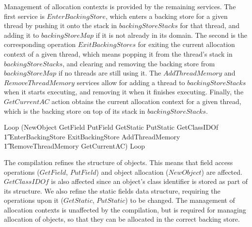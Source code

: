 Management of allocation contexts is provided by the remaining
services.
The first service is $EnterBackingStore$, which enters a backing store
for a given thread by pushing it onto the stack in
$backingStoreStacks$ for that thread, and adding it to
$backingStoreMap$ if it is not already in its domain.
The second is the corresponding operation $ExitBackingStores$ for
exiting the current allocation context of a given thread, which means
popping it from the thread's stack in $backingStoreStacks$, and
clearing and removing the backing store from $backingStoreMap$ if no
threads are still using it.
The $AddThreadMemory$ and $RemoveThreadMemory$ services allow for
adding a thread to $backingStoreStacks$ when it starts executing, and
removing it when it finishes executing.
Finally, the $GetCurrentAC$ action obtains the current allocation
context for a given thread, which is the backing store on top of its
stack in $backingStoreStacks$.
\begin{circusaction}
  Loop \circdef (NewObject \extchoice GetField \extchoice PutField \extchoice GetStatic \extchoice PutStatic \extchoice GetClassIDOf \\
  \t1 {} \extchoice EnterBackingStore \extchoice ExitBackingStore \extchoice AddThreadMemory \\
  \t1 {} \extchoice RemoveThreadMemory \extchoice GetCurrentAC)
  \circseq Loop
\end{circusaction}

The compilation refines the structure of objects.
This means that field access operations ($GetField$, $PutField$) and
object allocation ($NewObject$) are affected.
$GetClassIDOf$ is also affected since an object's class identifier is
stored as part of its structure.
We also refine the static fields data structure, requiring the
operations upon it ($GetStatic$, $PutStatic$) to be changed.
The management of allocation contexts is unaffected by the
compilation, but is required for managing allocation of objects, so
that they can be allocated in the correct backing store.

